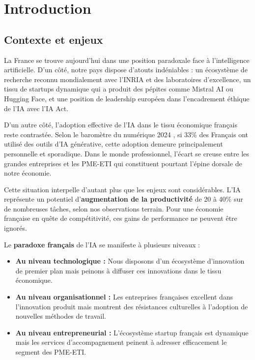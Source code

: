 \chapter{Introduction}
\label{chap:introduction}

\section{Contexte et enjeux}

La France se trouve aujourd'hui dans une position paradoxale face à l'intelligence artificielle. D'un côté, notre pays dispose d'atouts indéniables : un écosystème de recherche reconnu mondialement avec l'INRIA et des laboratoires d'excellence, un tissu de startups dynamique qui a produit des pépites comme Mistral AI ou Hugging Face, et une position de leadership européen dans l'encadrement éthique de l'IA avec l'IA Act.

D'un autre côté, l'adoption effective de l'IA dans le tissu économique français reste contrastée. Selon le baromètre du numérique 2024 \cite{laboratoire2025how}, si 33\% des Français ont utilisé des outils d'IA générative, cette adoption demeure principalement personnelle et sporadique. Dans le monde professionnel, l'écart se creuse entre les grandes entreprises et les PME-ETI qui constituent pourtant l'épine dorsale de notre économie.

Cette situation interpelle d'autant plus que les enjeux sont considérables. L'IA représente un potentiel d'\textbf{augmentation de la productivité} de 20 à 40\% sur de nombreuses tâches, selon nos observations terrain. Pour une économie française en quête de compétitivité, ces gains de performance ne peuvent être ignorés.

Le \textbf{paradoxe français} de l'IA se manifeste à plusieurs niveaux :

\begin{itemize}
    \item \textbf{Au niveau technologique :} Nous disposons d'un écosystème d'innovation de premier plan mais peinons à diffuser ces innovations dans le tissu économique.
    \item \textbf{Au niveau organisationnel :} Les entreprises françaises excellent dans l'innovation produit mais montrent des résistances culturelles à l'adoption de nouvelles méthodes de travail.
    \item \textbf{Au niveau entrepreneurial :} L'écosystème startup français est dynamique mais les services d'accompagnement peinent à adresser efficacement le segment des PME-ETI.
\end{itemize}

